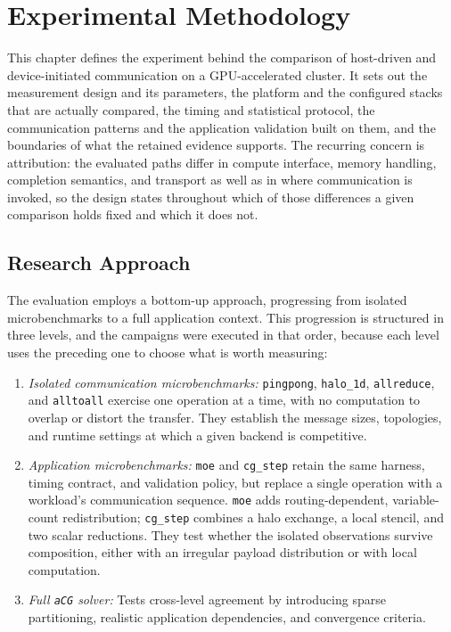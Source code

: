 \chapter{Experimental Methodology}\label{ch:m-methodology}

This chapter defines the experiment behind the comparison of host-driven and device-initiated communication on a GPU-accelerated cluster. It sets out the measurement design and its parameters, the platform and the configured stacks that are actually compared, the timing and statistical protocol, the communication patterns and the application validation built on them, and the boundaries of what the retained evidence supports. The recurring concern is attribution: the evaluated paths differ in compute interface, memory handling, completion semantics, and transport as well as in where communication is invoked, so the design states throughout which of those differences a given comparison holds fixed and which it does not.

\section{Research Approach}\label{sec:research-planning-levels}

The evaluation employs a bottom-up approach, progressing from isolated microbenchmarks to a full application context. This progression is structured in three levels, and the campaigns were executed in that order, because each level uses the preceding one to choose what is worth measuring:

\begin{enumerate}
    \item \emph{Isolated communication microbenchmarks:} \texttt{pingpong}, \texttt{halo\_1d}, \texttt{allreduce}, and \texttt{alltoall} exercise one operation at a time, with no computation to overlap or distort the transfer. They establish the message sizes, topologies, and runtime settings at which a given backend is competitive.
    \item \emph{Application microbenchmarks:} \texttt{moe} and \texttt{cg\_step} retain the same harness, timing contract, and validation policy, but replace a single operation with a workload's communication sequence. \texttt{moe} adds routing-dependent, variable-count redistribution; \texttt{cg\_step} combines a halo exchange, a local stencil, and two scalar reductions. They test whether the isolated observations survive composition, either with an irregular payload distribution or with local computation.
    \item \emph{Full \texttt{aCG} solver:} Tests cross-level agreement by introducing sparse partitioning, realistic application dependencies, and convergence criteria.
\end{enumerate}

